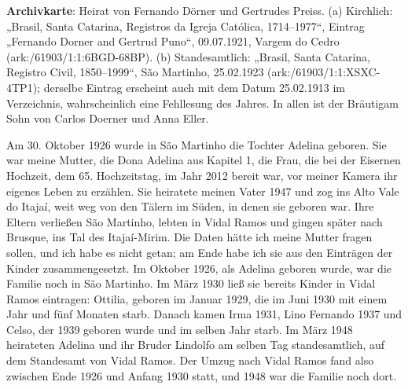 \documentclass[
  ngerman,
  11pt,
  openany]{book}
\begin{document}
\begin{ficha}

\textbf{Archivkarte}: Heirat von Fernando Dörner und Gertrudes Preiss.
(a) Kirchlich: „Brasil, Santa Catarina, Registros da Igreja Católica,
1714--1977``, Eintrag „Fernando Dorner and Gertrud Puno``, 09.07.1921,
Vargem do Cedro (ark:/61903/1:1:6BGD-68BP). (b) Standesamtlich: „Brasil,
Santa Catarina, Registro Civil, 1850--1999``, São Martinho, 25.02.1923
(ark:/61903/1:1:XSXC-4TP1); derselbe Eintrag erscheint auch mit dem
Datum 25.02.1913 im Verzeichnis, wahrscheinlich eine Fehllesung des
Jahres. In allen ist der Bräutigam Sohn von Carlos Doerner und Anna
Eller.

\end{ficha}

Am 30. Oktober 1926 wurde in São Martinho die Tochter Adelina geboren.
Sie war meine Mutter, die Dona Adelina aus Kapitel 1, die Frau, die bei
der Eisernen Hochzeit, dem 65. Hochzeitstag, im Jahr 2012 bereit war,
vor meiner Kamera ihr eigenes Leben zu erzählen. Sie heiratete meinen
Vater 1947 und zog ins Alto Vale do Itajaí, weit weg von den Tälern im
Süden, in denen sie geboren war. Ihre Eltern verließen São Martinho,
lebten in Vidal Ramos und gingen später nach Brusque, ins Tal des
Itajaí-Mirim. Die Daten hätte ich meine Mutter fragen sollen, und ich
habe es nicht getan; am Ende habe ich sie aus den Einträgen der Kinder
zusammengesetzt. Im Oktober 1926, als Adelina geboren wurde, war die
Familie noch in São Martinho. Im März 1930 ließ sie bereits Kinder in
Vidal Ramos eintragen: Ottilia, geboren im Januar 1929, die im Juni 1930
mit einem Jahr und fünf Monaten starb. Danach kamen Irma 1931, Lino
Fernando 1937 und Celso, der 1939 geboren wurde und im selben Jahr
starb. Im März 1948 heirateten Adelina und ihr Bruder Lindolfo am selben
Tag standesamtlich, auf dem Standesamt von Vidal Ramos. Der Umzug nach
Vidal Ramos fand also zwischen Ende 1926 und Anfang 1930 statt, und 1948
war die Familie noch dort.
\end{document}
